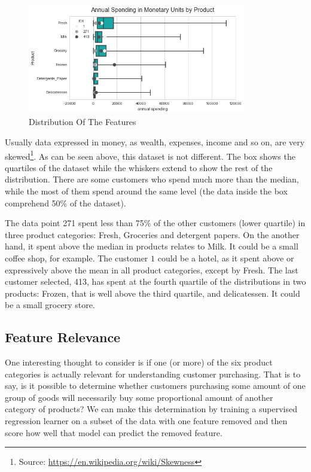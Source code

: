 \documentclass[a4paper]{article}
\begin{document}
\begin{figure}[ht!]
\centering
\includegraphics[width=0.85\textwidth]{figures/boxplot_features.png}
\caption{\label{fig:boxplot}Distribution Of The Features}
\end{figure}

Usually data expressed in money, as wealth, expenses, income and so on, are very skewed\footnote{Source: \url{https://en.wikipedia.org/wiki/Skewness}}. As can be seen above, this dataset is not different. The box shows the quartiles of the dataset while the whiskers extend to show the rest of the distribution. There are some customers who spend much more than the median, while the most of them spend around the same level (the data inside the box comprehend 50\% of the dataset).

The data point 271 spent less than 75\% of the other customers (lower quartile) in three product categories: Fresh, Groceries and detergent papers. On the another hand, it spent above the median in products relates to Milk. It could be a small coffee shop, for example. The customer $1$ could be a hotel, as it spent above or expressively above the mean in all product categories, except by Fresh. The last customer selected, 413, has spent at the fourth quartile of the distributions in two products: Frozen, that is well above the third quartile, and delicatessen. It could be a small grocery store.

\subsection{Feature Relevance}
One interesting thought to consider is if one (or more) of the six product categories is actually relevant for understanding customer purchasing. That is to say, is it possible to determine whether customers purchasing some amount of one group of goods will necessarily buy some proportional amount of another category of products? We can make this determination by training a supervised regression learner on a subset of the data with one feature removed and then score how well that model can predict the removed feature.
\end{document}
